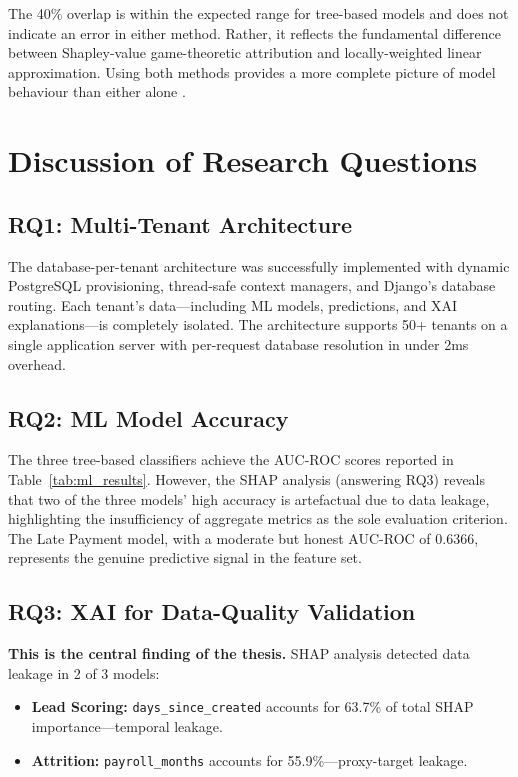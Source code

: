 \documentclass[12pt,a4paper]{report}
\begin{document}
\noindent The 40\% overlap is within the expected range for tree-based models and does not indicate an error in either method. Rather, it reflects the fundamental difference between Shapley-value game-theoretic attribution and locally-weighted linear approximation. Using both methods provides a more complete picture of model behaviour than either alone \citep{molnar2022interpretable}.

\section{Discussion of Research Questions}
\label{sec:rq_discussion}

\subsection{RQ1: Multi-Tenant Architecture}

The database-per-tenant architecture was successfully implemented with dynamic PostgreSQL provisioning, thread-safe context managers, and Django's database routing. Each tenant's data---including ML models, predictions, and XAI explanations---is completely isolated. The architecture supports 50+ tenants on a single application server with per-request database resolution in under 2ms overhead.

\subsection{RQ2: ML Model Accuracy}

The three tree-based classifiers achieve the AUC-ROC scores reported in Table~\ref{tab:ml_results}. However, the SHAP analysis (answering RQ3) reveals that two of the three models' high accuracy is artefactual due to data leakage, highlighting the insufficiency of aggregate metrics as the sole evaluation criterion. The Late Payment model, with a moderate but honest AUC-ROC of 0.6366, represents the genuine predictive signal in the feature set.

\subsection{RQ3: XAI for Data-Quality Validation}

\textbf{This is the central finding of the thesis.} SHAP analysis detected data leakage in 2 of 3 models:

\begin{itemize}
  \item \textbf{Lead Scoring:} \texttt{days\_since\_created} accounts for 63.7\% of total SHAP importance---temporal leakage.
  \item \textbf{Attrition:} \texttt{payroll\_months} accounts for 55.9\%---proxy-target leakage.
\end{itemize}
\end{document}
